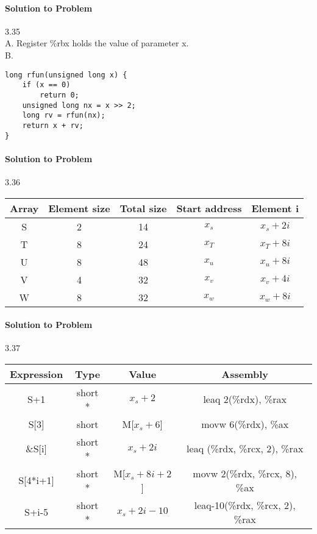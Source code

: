 \documentclass{report}
\begin{document}
\paragraph{Solution to Problem } 3.35\\
A. Register \%rbx holds the value of parameter x. \\
B. 
\begin{lstlisting}
long rfun(unsigned long x) {
    if (x == 0) 
        return 0;
    unsigned long nx = x >> 2;
    long rv = rfun(nx);
    return x + rv;
}
\end{lstlisting}

\paragraph{Solution to Problem } 3.36\\
\begin{center}
\begin{tabular}{ |c|c|c|c|c|} 
\hline
Array & Element size & Total size & Start address & Element i \\ \hline
S & 2 & 14 & $x_s$ & $x_s + 2i$ \\
T & 8 & 24 & $x_T$ & $x_T + 8i$ \\
U & 8 & 48 & $x_u$ & $x_u + 8i$ \\
V & 4 & 32 & $x_v$ & $x_v + 4i$ \\
W & 8 & 32 & $x_w$ & $x_w + 8i$ \\
\hline
\end{tabular}
\end{center}

\paragraph{Solution to Problem } 3.37\\
\begin{center}
\begin{tabular}{ |c|c|c|c| } 
\hline
Expression & Type & Value & Assembly \\ \hline
S+1 & short * & $x_s + 2$ & leaq 2(\%rdx), \%rax \\
S[3] & short & M[$x_s+6$] & movw 6(\%rdx), \%ax \\ 
\&S[i] & short * & $x_s+2i$ & leaq (\%rdx, \%rcx, 2), \%rax \\
S[4*i+1] & short *& M[$x_s+8i+2$] & movw 2(\%rdx, \%rcx, 8), \%ax \\
S+i-5 & short * & $x_s+2i-10$ & leaq-10(\%rdx, \%rcx, 2), \%rax \\
\hline
\end{tabular}
\end{center}
\end{document}
